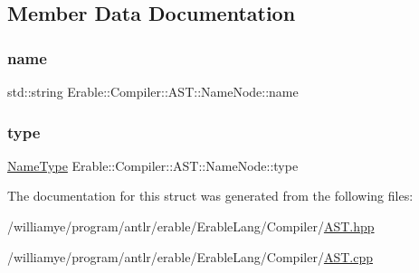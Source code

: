 \subsection{Member Data Documentation}
\mbox{\label{struct_erable_1_1_compiler_1_1_a_s_t_1_1_name_node_a11152e1bde7049caa9f7036016ad3098}} 
\subsubsection{\texorpdfstring{name}{name}}
{\footnotesize\ttfamily std\+::string Erable\+::\+Compiler\+::\+A\+S\+T\+::\+Name\+Node\+::name}

\mbox{\label{struct_erable_1_1_compiler_1_1_a_s_t_1_1_name_node_a63676b5da4555fa31cb7448ef3512d84}} 
\subsubsection{\texorpdfstring{type}{type}}
{\footnotesize\ttfamily \mbox{\hyperlink{namespace_erable_1_1_compiler_1_1_a_s_t_a9359137137aacfee07e935a0ae706a84}{Name\+Type}} Erable\+::\+Compiler\+::\+A\+S\+T\+::\+Name\+Node\+::type}



The documentation for this struct was generated from the following files\+:\begin{DoxyCompactItemize}
\item 
/williamye/program/antlr/erable/\+Erable\+Lang/\+Compiler/\mbox{\hyperlink{_a_s_t_8hpp}{A\+S\+T.\+hpp}}\item 
/williamye/program/antlr/erable/\+Erable\+Lang/\+Compiler/\mbox{\hyperlink{_a_s_t_8cpp}{A\+S\+T.\+cpp}}\end{DoxyCompactItemize}
